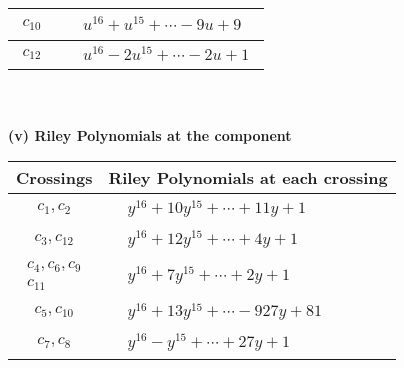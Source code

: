 \documentclass[1p]{elsarticle_modified}
\theoremstyle{definition}
\begin{document}
\begin{tabular}{m{50pt}|m{274pt}}
\hline $$\begin{aligned}c_{10}\end{aligned}$$&$\begin{aligned}
&u^{16}+u^{15}+\cdots-9 u+9
\end{aligned}$\\
\hline $$\begin{aligned}c_{12}\end{aligned}$$&$\begin{aligned}
&u^{16}-2 u^{15}+\cdots-2 u+1
\end{aligned}$\\
\hline
\end{tabular}\\~\\
\newpage\renewcommand{\arraystretch}{1}
\flushleft \textbf{(v) Riley Polynomials at the component}\newline \\
\begin{tabular}{m{50pt}|m{274pt}}
Crossings & \hspace{64pt}Riley Polynomials at each crossing \\
\hline $$\begin{aligned}c_{1},c_{2}\end{aligned}$$&$\begin{aligned}
&y^{16}+10 y^{15}+\cdots+11 y+1
\end{aligned}$\\
\hline $$\begin{aligned}c_{3},c_{12}\end{aligned}$$&$\begin{aligned}
&y^{16}+12 y^{15}+\cdots+4 y+1
\end{aligned}$\\
\hline $$\begin{aligned}c_{4},c_{6},c_{9}\\c_{11}\end{aligned}$$&$\begin{aligned}
&y^{16}+7 y^{15}+\cdots+2 y+1
\end{aligned}$\\
\hline $$\begin{aligned}c_{5},c_{10}\end{aligned}$$&$\begin{aligned}
&y^{16}+13 y^{15}+\cdots-927 y+81
\end{aligned}$\\
\hline $$\begin{aligned}c_{7},c_{8}\end{aligned}$$&$\begin{aligned}
&y^{16}- y^{15}+\cdots+27 y+1
\end{aligned}$\\
\hline
\end{tabular}\\~\\
\end{document}
